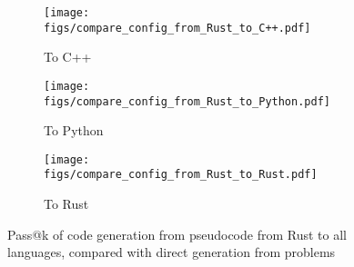 \begin{figure*}[t]
\centering
    \begin{subfigure}[b]{\textwidth}
         \centering
         \texttt{[image: figs/compare\_config\_from\_Rust\_to\_C++.pdf]} %
         \caption{To C++}
    \end{subfigure}
    \begin{subfigure}[b]{\textwidth}
         \centering
         \texttt{[image: figs/compare\_config\_from\_Rust\_to\_Python.pdf]}
         \caption{To Python}
    \end{subfigure}
    \begin{subfigure}[b]{\textwidth}
         \centering
         \texttt{[image: figs/compare\_config\_from\_Rust\_to\_Rust.pdf]}
         \caption{To Rust}
    \end{subfigure}
  \caption {Pass@k of code generation from pseudocode from Rust to all languages, compared with direct generation from problems}
  \label{fig:compare-config-rust}
\end{figure*}
